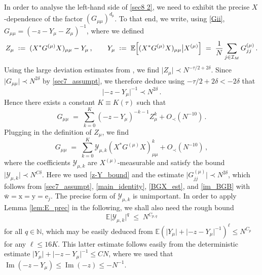 \documentclass[11pt]{article} %
\newcommand{\nc}{\normalcolor}
\numberwithin{equation}{section}
\numberwithin{figure}{section}
\theoremstyle{plain} %
\theoremstyle{definition} %
\newcommand{\f}[1]{\boldsymbol{\mathrm{#1}}} %
\renewcommand{\cal}{\mathcal}
\newcommand{\E}{\mathbb{E}}
\newcommand{\N}{\mathbb{N}}
\newcommand*{\deq}{\mathrel{\vcenter{\baselineskip0.65ex \lineskiplimit0pt \hbox{.}\hbox{.}}}=}
\renewcommand{\leq}{\leqslant}
\newcommand{\p}[1]{({#1})}
\newcommand{\qB}[1]{\Bigl[{#1}\Bigr]}
\newcommand{\abs}[1]{\lvert #1 \rvert}
\DeclareMathOperator{\im}{Im}
\begin{document}
In order to analyse the left-hand side of \eqref{sec8 2}, we need to exhibit the precise $X$-dependence of the factor $(G_{\mu \mu})^{d_{\f \mu}}$. To that end, we write, using \eqref{Gii}, $G_{\mu \mu} = \p{-z - Y_\mu - Z_\mu}^{-1}$,
where we defined
\begin{equation*}
Z_\mu \;\deq\; (X^* G^{(\mu)} X)_{\mu \mu} - Y_\mu\,, \qquad
Y_\mu \;\deq\; \E \qB{(X^* G^{(\mu)} X)_{\mu \mu} \big\vert X^{(\mu)}} \;=\; \frac{1}{N} \sum_{j \in \cal I_M} G^{(\mu)}_{jj}\,.
\end{equation*}
Using the large deviation estimates from \cite[Lemma 3.1]{BEKYY}, we find $\abs{Z_\mu} \prec N^{-\tau/2 + 2 \delta}$. Since $\abs{G_{\mu \mu}} \prec N^{2 \delta}$ by \eqref{sec7_assumpt}, we therefore deduce using $-\tau/2 + 2 \delta < - 2 \delta$ \nc that
\begin{equation} \label{z-Y_bound}
\abs{-z - Y_\mu}^{-1} \prec N^{2 \delta}\,.
\end{equation}
Hence there exists a constant $K \equiv K(\tau)$ such that
\begin{equation*}
G_{\mu \mu} \;=\; \sum_{k = 0}^K (-z - Y_\mu)^{-k - 1} Z_\mu^k + O_\prec(N^{-10})\,.
\end{equation*}
Plugging in the definition of $Z_\mu$, we find
\begin{equation} \label{Gmumu_exp2}
G_{\mu \mu} \;=\; \sum_{k = 0}^K \cal Y_{\mu,k} (X^* G^{(\mu)} X)_{\mu \mu}^k + O_\prec(N^{-10})\,,
\end{equation}
where the coefficients $\cal Y_{\mu,k}$ are $X^{(\mu)}$-measurable and satisfy the bound $\abs{\cal Y_{\mu, k}} \prec N^{C \delta}$.
Here we used \eqref{z-Y_bound} and the estimate $\abs{G_{jj}^{(\mu)}} \prec N^{2 \delta}$, which follows from \eqref{sec7_assumpt}, \eqref{main_identity}, \eqref{BGX_est}, and \eqref{im_BGB} with $\bar {\f w} = \f x = \f y = \f e_j$.
The precise form of $\cal Y_{\mu,k}$ is unimportant. In order to apply Lemma \ref{lem:E_prec} in the following, we shall also need the rough bound
\begin{equation} \label{cal_Y_rough}
\E \abs{\cal Y_{\mu,k}}^q \;\leq\; N^{C_{p,q}}
\end{equation}
for all $q \in \N$,
which may be easily deduced from $\E (\abs{Y_\mu} + \abs{-z - Y_\mu}^{-1})^{\ell} \leq N^{C_p}$ for any $\ell \leq 16 K$. This latter estimate follows easily from the deterministic estimate $\abs{Y_\mu} + \abs{-z - Y_\mu}^{-1} \leq CN$, where we used that $\im (-z - Y_\mu) \leq \im (-z) \leq -N^{-1}$.
\end{document}
